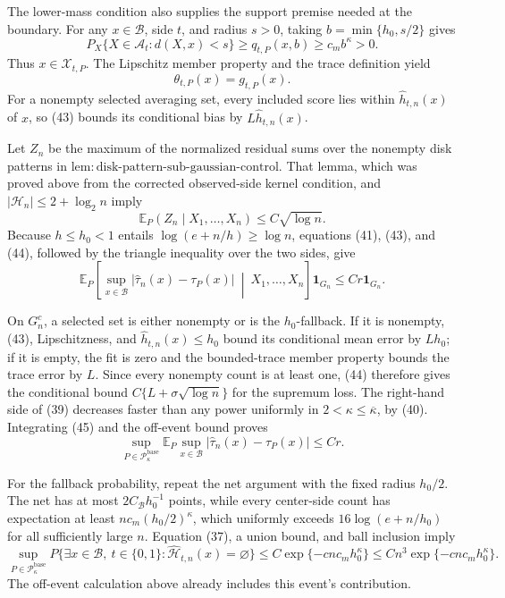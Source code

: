 The lower-mass condition also supplies the support premise needed at the boundary. For any \(x\in\mathcal B\), side \(t\), and radius \(s>0\), taking \(b=\min\{h_0,s/2\}\) gives
\[
 P_X\{X\in\mathcal A_t:d(X,x)<s\}
 \ge q_{t,P}(x,b)\ge c_mb^\kappa>0. \tag{42}
\]
Thus \(x\in\mathcal X_{t,P}\). The Lipschitz member property and the trace definition yield
\[
 \theta_{t,P}(x)=g_{t,P}(x). \tag{43}
\]
For a nonempty selected averaging set, every included score lies within \(\widehat h_{t,n}(x)\) of \(x\), so (43) bounds its conditional bias by \(L\widehat h_{t,n}(x)\).

Let \(Z_n\) be the maximum of the normalized residual sums over the nonempty disk patterns in \(\mathrm{lem:disk\text{-}pattern\text{-}sub\text{-}gaussian\text{-}control}\). That lemma, which was proved above from the corrected observed-side kernel condition, and \(|\mathcal H_n|\le 2+\log_2 n\) imply
\[
 \mathbb E_P(Z_n\mid X_1,\ldots,X_n)\le C\sqrt{\log n}. \tag{44}
\]
Because \(h\le h_0<1\) entails \(\log(e+n/h)\ge\log n\), equations (41), (43), and (44), followed by the triangle inequality over the two sides, give
\[
 \mathbb E_P\!\left[\sup_{x\in\mathcal B}|\widehat\tau_n(x)-\tau_P(x)|
 \ \middle|\ X_1,\ldots,X_n\right]\mathbf 1_{G_n}
 \le Cr\mathbf 1_{G_n}. \tag{45}
\]

On \(G_n^c\), a selected set is either nonempty or is the \(h_0\)-fallback. If it is nonempty, (43), Lipschitzness, and \(\widehat h_{t,n}(x)\le h_0\) bound its conditional mean error by \(Lh_0\); if it is empty, the fit is zero and the bounded-trace member property bounds the trace error by \(L\). Since every nonempty count is at least one, (44) therefore gives the conditional bound \(C\{L+\sigma\sqrt{\log n}\}\) for the supremum loss. The right-hand side of (39) decreases faster than any power uniformly in \(2<\kappa\le\overline\kappa\), by (40). Integrating (45) and the off-event bound proves
\[
 \sup_{P\in\mathcal P_{\kappa}^{\mathrm{base}}}
 \mathbb E_P\sup_{x\in\mathcal B}|\widehat\tau_n(x)-\tau_P(x)|
 \le Cr. \tag{46}
\]

For the fallback probability, repeat the net argument with the fixed radius \(h_0/2\). The net has at most \(2C_{\mathcal B}h_0^{-1}\) points, while every center-side count has expectation at least \(nc_m(h_0/2)^\kappa\), which uniformly exceeds \(16\log(e+n/h_0)\) for all sufficiently large \(n\). Equation (37), a union bound, and ball inclusion imply
\[
 \sup_{P\in\mathcal P_{\kappa}^{\mathrm{base}}}
 P\{\exists x\in\mathcal B,\ t\in\{0,1\}:\widehat{\mathcal H}_{t,n}(x)=\varnothing\}
 \le C\exp\{-c n c_mh_0^\kappa\}
 \le Cn^3\exp\{-c n c_mh_0^\kappa\}. \tag{47}
\]
The off-event calculation above already includes this event's contribution.

